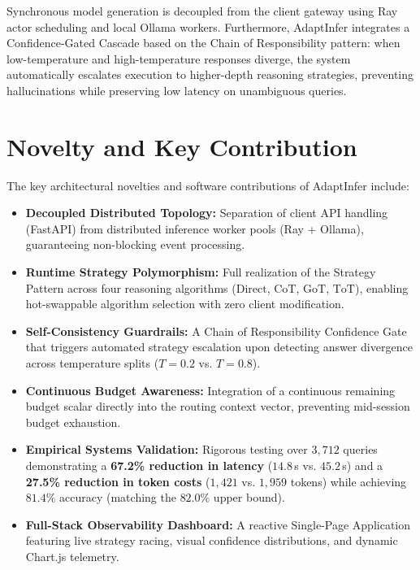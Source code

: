 \documentclass[12pt,a4paper]{report}
\begin{document}
Synchronous model generation is decoupled from the client gateway using Ray actor scheduling and local Ollama workers. Furthermore, AdaptInfer integrates a Confidence-Gated Cascade based on the Chain of Responsibility pattern: when low-temperature and high-temperature responses diverge, the system automatically escalates execution to higher-depth reasoning strategies, preventing hallucinations while preserving low latency on unambiguous queries.

\section{Novelty and Key Contribution}
\label{sec:novelty}
The key architectural novelties and software contributions of AdaptInfer include:
\begin{itemize}[leftmargin=*]
    \item \textbf{Decoupled Distributed Topology:} Separation of client API handling (FastAPI) from distributed inference worker pools (Ray + Ollama), guaranteeing non-blocking event processing.
    \item \textbf{Runtime Strategy Polymorphism:} Full realization of the Strategy Pattern across four reasoning algorithms ($\text{Direct}$, $\text{CoT}$, $\text{GoT}$, $\text{ToT}$), enabling hot-swappable algorithm selection with zero client modification.
    \item \textbf{Self-Consistency Guardrails:} A Chain of Responsibility Confidence Gate that triggers automated strategy escalation upon detecting answer divergence across temperature splits ($T=0.2$ vs. $T=0.8$).
    \item \textbf{Continuous Budget Awareness:} Integration of a continuous remaining budget scalar directly into the routing context vector, preventing mid-session budget exhaustion.
    \item \textbf{Empirical Systems Validation:} Rigorous testing over $3,712$ queries demonstrating a \textbf{67.2\% reduction in latency} ($14.8$\,s vs. $45.2$\,s) and a \textbf{27.5\% reduction in token costs} ($1,421$ vs. $1,959$ tokens) while achieving $81.4\%$ accuracy (matching the $82.0\%$ upper bound).
    \item \textbf{Full-Stack Observability Dashboard:} A reactive Single-Page Application featuring live strategy racing, visual confidence distributions, and dynamic Chart.js telemetry.
\end{itemize}

\end{document}
